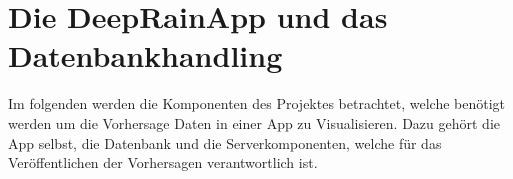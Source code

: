 \section{Die DeepRainApp und das Datenbankhandling}\label{die deeprain app und das datenbankhandling}  
Im folgenden werden die Komponenten des Projektes betrachtet, welche benötigt werden um die Vorhersage Daten in einer App zu Visualisieren.
Dazu gehört die App selbst, die Datenbank und die Serverkomponenten, welche für das Veröffentlichen der Vorhersagen verantwortlich ist. 





